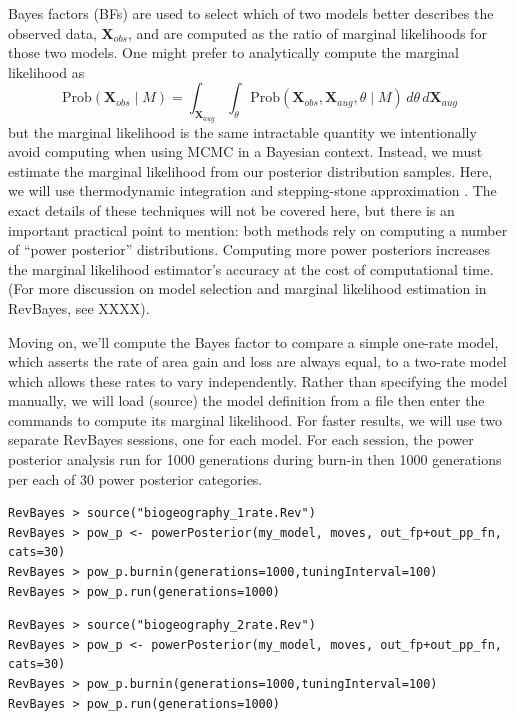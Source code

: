 \documentclass[11pt]{article}
\begin{document}
Bayes factors (BFs) are used to select which of two models better describes the observed data, $\mathbf{X}_{obs}$, and are computed as the ratio of marginal likelihoods for those two models.
One might prefer to analytically compute the marginal likelihood as 
\[
\text{Prob}(\mathbf{X}_{obs} \mid M) = \int_{\mathbf{X}_{aug}} \int_{\theta} \text{Prob}(\mathbf{X}_{obs}, \mathbf{X}_{aug}, \theta \mid M) \, d\theta \, d\mathbf{X}_{aug}
\]
but the marginal likelihood is the same intractable quantity we intentionally avoid computing when using MCMC in a Bayesian context.
Instead, we must estimate the marginal likelihood from our posterior distribution samples.
Here, we will use thermodynamic integration \citep{lartillot06} and stepping-stone approximation \citep{xi11}.
The exact details of these techniques will not be covered here, but there is an important practical point to mention: both methods rely on computing a number of ``power posterior'' distributions.
Computing more power posteriors increases the marginal likelihood estimator's accuracy at the cost of computational time.
(For more discussion on model selection and marginal likelihood estimation in RevBayes, see XXXX).

Moving on, we'll compute the Bayes factor to compare a simple one-rate model, which asserts the rate of area gain and loss are always equal, to a two-rate model which allows these rates to vary independently.
Rather than specifying the model manually, we will load (source) the model definition from a file then enter the commands to compute its marginal likelihood.
For faster results, we will use two separate RevBayes sessions, one for each model.
For each session, the power posterior analysis run for 1000 generations during burn-in then 1000 generations per each of 30 power posterior categories.

\begin{snugshade}
\begin{lstlisting}
RevBayes > source("biogeography_1rate.Rev")
RevBayes > pow_p <- powerPosterior(my_model, moves, out_fp+out_pp_fn, cats=30) 
RevBayes > pow_p.burnin(generations=1000,tuningInterval=100)
RevBayes > pow_p.run(generations=1000)
\end{lstlisting}
\end{snugshade}

\begin{snugshade}
\begin{lstlisting}
RevBayes > source("biogeography_2rate.Rev")
RevBayes > pow_p <- powerPosterior(my_model, moves, out_fp+out_pp_fn, cats=30) 
RevBayes > pow_p.burnin(generations=1000,tuningInterval=100)
RevBayes > pow_p.run(generations=1000)  
\end{lstlisting}
\end{snugshade}
\end{document}
